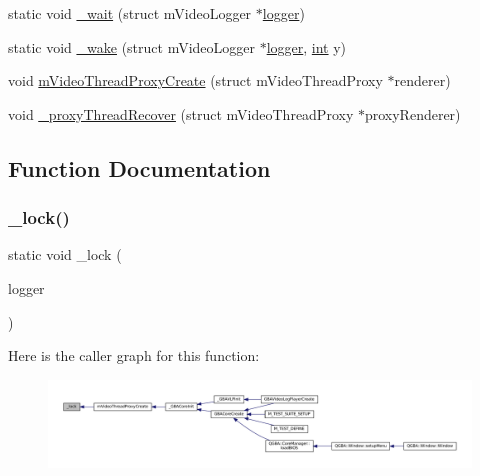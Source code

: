 \begin{DoxyCompactItemize}
\item 
static void \mbox{\hyperlink{thread-proxy_8c_adbc17597459e4e98b86b4b1821d1040f}{\+\_\+wait}} (struct m\+Video\+Logger $\ast$\mbox{\hyperlink{libretro_8c_a370b093d59813e9620a3b73b831162c2}{logger}})
\item 
static void \mbox{\hyperlink{thread-proxy_8c_afb1377b4c16e0b5aa347a274d5323ec6}{\+\_\+wake}} (struct m\+Video\+Logger $\ast$\mbox{\hyperlink{libretro_8c_a370b093d59813e9620a3b73b831162c2}{logger}}, \mbox{\hyperlink{ioapi_8h_a787fa3cf048117ba7123753c1e74fcd6}{int}} y)
\item 
void \mbox{\hyperlink{thread-proxy_8c_a8c023e44feda4222c0441d7bb694f546}{m\+Video\+Thread\+Proxy\+Create}} (struct m\+Video\+Thread\+Proxy $\ast$renderer)
\item 
void \mbox{\hyperlink{thread-proxy_8c_a9f7602077816bb1ca3bf15db67d76f17}{\+\_\+proxy\+Thread\+Recover}} (struct m\+Video\+Thread\+Proxy $\ast$proxy\+Renderer)
\end{DoxyCompactItemize}


\subsection{Function Documentation}
\mbox{\label{thread-proxy_8c_a5831b9040d25c76acbdf0bc2817acd02}} 
\subsubsection{\texorpdfstring{\+\_\+lock()}{\_lock()}}
{\footnotesize\ttfamily static void \+\_\+lock (\begin{DoxyParamCaption}\item[{struct m\+Video\+Logger $\ast$}]{logger }\end{DoxyParamCaption})\hspace{0.3cm}{\ttfamily [static]}}

Here is the caller graph for this function\+:
\nopagebreak
\begin{figure}[H]
\begin{center}
\leavevmode
\includegraphics[width=350pt]{thread-proxy_8c_a5831b9040d25c76acbdf0bc2817acd02_icgraph}
\end{center}
\end{figure}
\mbox{\label{thread-proxy_8c_a7b9189ee6a6460af05b9f19e95015c98}} 
